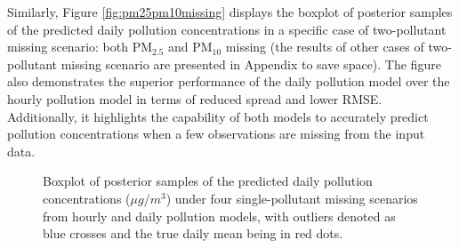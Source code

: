\documentclass[
  12,
]{article}
\begin{document}
Similarly, Figure \ref{fig:pm25pm10missing} displays the boxplot of
posterior samples of the predicted daily pollution concentrations in a
specific case of two-pollutant missing scenario: both PM\(_{2.5}\) and
PM\(_{10}\) missing (the results of other cases of two-pollutant missing
scenario are presented in Appendix to save space). The figure also
demonstrates the superior performance of the daily pollution model over
the hourly pollution model in terms of reduced spread and lower RMSE.
Additionally, it highlights the capability of both models to accurately
predict pollution concentrations when a few observations are missing
from the input data.

\begin{figure}[H]
\caption[Boxplot of posterior samples of the predicted daily pollution concentrations ($\mu g/m^3$) under four single-pollutant missing scenarios from hourly and daily pollution models, with outliers denoted as blue crosses and the true daily mean being in red dots]{Boxplot of posterior samples of the predicted daily pollution concentrations ($\mu g/m^3$) under four single-pollutant missing scenarios from hourly and daily pollution models, with outliers denoted as blue crosses and the true daily mean being in red dots.}\label{fig:singleMissing}
\end{figure}
\end{document}
